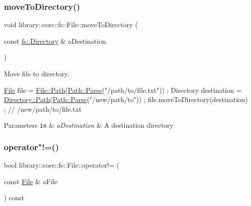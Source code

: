 \subsubsection{\texorpdfstring{move\+To\+Directory()}{moveToDirectory()}}
{\footnotesize\ttfamily void library\+::core\+::fs\+::\+File\+::move\+To\+Directory (\begin{DoxyParamCaption}\item[{const \hyperlink{classlibrary_1_1core_1_1fs_1_1Directory}{fs\+::\+Directory} \&}]{a\+Destination }\end{DoxyParamCaption})}



Move file to directory. 


\begin{DoxyCode}
\hyperlink{classlibrary_1_1core_1_1fs_1_1File_a7490060f19a21d4ee58bb6cec87a1ca6}{File} file = \hyperlink{classlibrary_1_1core_1_1fs_1_1File_a0e0d8a8becb3cdd21775554e181452d8}{File::Path}(\hyperlink{classlibrary_1_1core_1_1fs_1_1Path_aebf5bd3af83e0b7376616e146f3e55df}{Path::Parse}(\textcolor{stringliteral}{"/path/to/file.txt"})) ;
Directory destination = \hyperlink{classlibrary_1_1core_1_1fs_1_1Directory_a6d3ea04654841e62a4dbd99feb563caf}{Directory::Path}(\hyperlink{classlibrary_1_1core_1_1fs_1_1Path_aebf5bd3af83e0b7376616e146f3e55df}{Path::Parse}(\textcolor{stringliteral}{"/new/path/to"})) ;
file.moveToDirectory(destination) ; \textcolor{comment}{// /new/path/to/file.txt}
\end{DoxyCode}



\begin{DoxyParams}[1]{Parameters}
\mbox{\tt in}  & {\em a\+Destination} & A destination directory \\
\hline
\end{DoxyParams}
\mbox{\label{classlibrary_1_1core_1_1fs_1_1File_a0354b6dd59250c07cd5a8b679dc36d95}} 
\subsubsection{\texorpdfstring{operator"!=()}{operator!=()}}
{\footnotesize\ttfamily bool library\+::core\+::fs\+::\+File\+::operator!= (\begin{DoxyParamCaption}\item[{const \hyperlink{classlibrary_1_1core_1_1fs_1_1File}{File} \&}]{a\+File }\end{DoxyParamCaption}) const}



